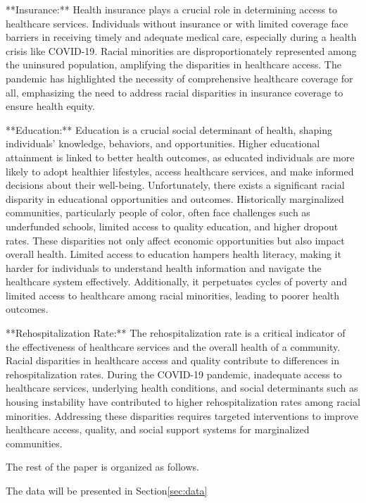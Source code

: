 \documentclass[12pt]{article}
\begin{document}
**Insurance:**
Health insurance plays a crucial role in determining access to healthcare services. Individuals without insurance 
or with limited coverage face barriers in receiving timely and adequate medical care, especially during a health 
crisis like COVID-19. Racial minorities are disproportionately represented among the uninsured population, amplifying 
the disparities in healthcare access. The pandemic has highlighted the necessity of comprehensive healthcare coverage 
for all, emphasizing the need to address racial disparities in insurance coverage to ensure health equity.

**Education:**
Education is a crucial social determinant of health, shaping individuals' knowledge, behaviors, and opportunities.
Higher educational attainment is linked to better health outcomes, as educated individuals are more likely to adopt 
healthier lifestyles, access healthcare services, and make informed decisions about their well-being. Unfortunately, 
there exists a significant racial disparity in educational opportunities and outcomes. Historically marginalized 
communities, particularly people of color, often face challenges such as underfunded schools, limited access to 
quality education, and higher dropout rates. These disparities not only affect economic opportunities but also impact
overall health. Limited access to education hampers health literacy, making it harder for individuals to understand 
health information and navigate the healthcare system effectively. Additionally, it perpetuates cycles of poverty and 
limited access to healthcare among racial minorities, leading to poorer health outcomes.

**Rehospitalization Rate:**
The rehospitalization rate is a critical indicator of the effectiveness of healthcare services and the overall 
health of a community. Racial disparities in healthcare access and quality contribute to differences in 
rehospitalization rates. During the COVID-19 pandemic, inadequate access to healthcare services, underlying 
health conditions, and social determinants such as housing instability have contributed to higher rehospitalization 
rates among racial minorities. Addressing these disparities requires targeted interventions to improve healthcare access, 
quality, and social support systems for marginalized communities.



The rest of the paper is organized as follows.

The data will be presented in Section\ref{sec:data}
\end{document}
